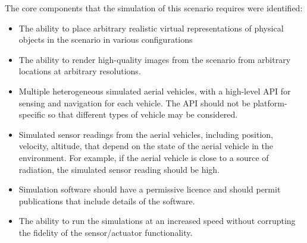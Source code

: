 The core components that the simulation of this scenario requires were identified: 
\begin{itemize}
    \item The ability to place arbitrary realistic virtual representations of physical objects in the scenario in various configurations
    \item The ability to render high-quality images from the scenario from arbitrary locations at arbitrary resolutions.
    \item Multiple heterogeneous simulated aerial vehicles, with a high-level API for sensing and navigation for each vehicle. The API should not be platform-specific so that different types of vehicle may be considered.
    \item Simulated sensor readings from the aerial vehicles, including position, velocity, altitude, that depend on the state of the aerial vehicle in the environment. For example, if the aerial vehicle is close to a source of radiation, the simulated sensor reading should be high.
    \item Simulation software should have a permissive licence and should permit publications that include details of the software.
    \item The ability to run the simulations at an increased speed without corrupting the fidelity of the sensor/actuator functionality.
\end{itemize}

